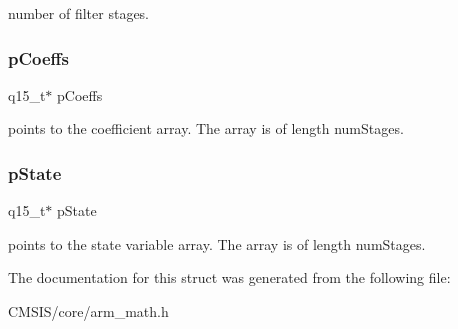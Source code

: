 number of filter stages. \mbox{\label{structarm__fir__lattice__instance__q15_a7ca181a37f714d174445f486bebce26f}} 
\subsubsection{\texorpdfstring{p\+Coeffs}{pCoeffs}}
{\footnotesize\ttfamily q15\+\_\+t$\ast$ p\+Coeffs}

points to the coefficient array. The array is of length num\+Stages. \mbox{\label{structarm__fir__lattice__instance__q15_ae29dfdb736374fcddaeaec4b7770170c}} 
\subsubsection{\texorpdfstring{p\+State}{pState}}
{\footnotesize\ttfamily q15\+\_\+t$\ast$ p\+State}

points to the state variable array. The array is of length num\+Stages. 

The documentation for this struct was generated from the following file\+:\begin{DoxyCompactItemize}
\item 
C\+M\+S\+I\+S/core/arm\+\_\+math.\+h\end{DoxyCompactItemize}
